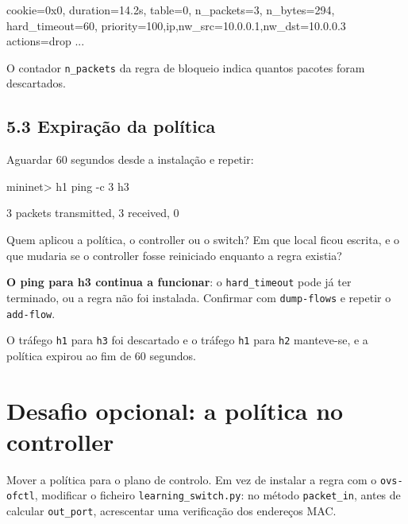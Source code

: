 \documentclass[11pt,a4paper]{article}
\newcommand{\cmd}[1]{\texttt{#1}}
\begin{document}
\begin{saida}
 cookie=0x0, duration=14.2s, table=0, n_packets=3, n_bytes=294, hard_timeout=60, priority=100,ip,nw_src=10.0.0.1,nw_dst=10.0.0.3 actions=drop
 ...
\end{saida}

O contador \cmd{n\_packets} da regra de bloqueio indica quantos pacotes foram descartados.

\subsection*{5.3 Expiração da política}

Aguardar 60 segundos desde a instalação e repetir:

\begin{terminal}
mininet> h1 ping -c 3 h3
\end{terminal}

\begin{saida}
3 packets transmitted, 3 received, 0%
\end{saida}

\begin{observe}
Quem aplicou a política, o controller ou o switch? Em que local ficou escrita, e o que mudaria se o controller fosse reiniciado enquanto a regra existia?
\end{observe}

\begin{erro}
\textbf{O ping para h3 continua a funcionar}: o \cmd{hard\_timeout} pode já ter terminado, ou a regra não foi instalada. Confirmar com \cmd{dump-flows} e repetir o \cmd{add-flow}.
\end{erro}

\begin{feito}
O tráfego \cmd{h1} para \cmd{h3} foi descartado e o tráfego \cmd{h1} para \cmd{h2} manteve-se, e a política expirou ao fim de 60 segundos.
\end{feito}

\section*{Desafio opcional: a política no controller}

Mover a política para o plano de controlo. Em vez de instalar a regra com o \cmd{ovs-ofctl}, modificar o ficheiro \cmd{learning\_switch.py}: no método \cmd{packet\_in}, antes de calcular \cmd{out\_port}, acrescentar uma verificação dos endereços MAC.
\end{document}

